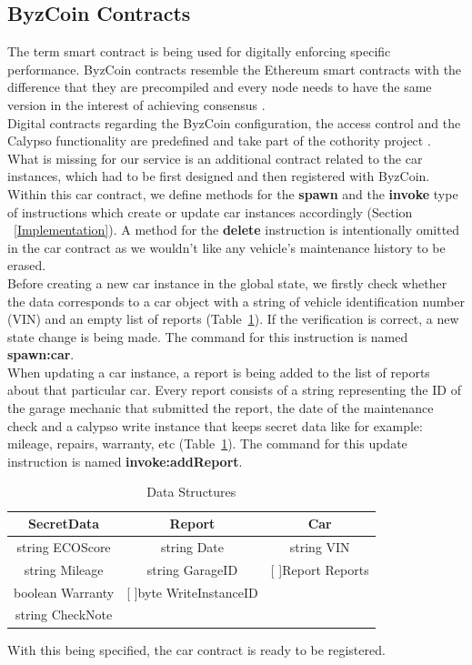 \subsection{ByzCoin Contracts}

The term smart contract is being used for digitally enforcing specific performance. ByzCoin contracts resemble the Ethereum smart contracts \cite{Ethereum} with the difference that they are precompiled and every node needs to have the same version in the interest of achieving consensus \cite{Contracts}.\\
\newline
Digital contracts \cite{Contracts} regarding the ByzCoin configuration, the access control and the Calypso functionality are predefined and take part of the cothority project \cite{Cothority}.
What is missing for our service is an additional contract related to the car instances, which had to be first designed and then registered with ByzCoin.\\
\newline
Within this car contract, we define methods for the \textbf{spawn} and the \textbf{invoke} type of instructions which create or update car instances accordingly (Section ~\ref{Implementation}). A method for the \textbf{delete} instruction is intentionally omitted in the car contract as we wouldn't like any vehicle's maintenance history to be erased.\\
\newline
Before creating a new car instance in the global state, we firstly check whether the data corresponds to a car object with a string of vehicle identification number (VIN) and an empty list of reports (Table~\ref{Data Structures}). If the verification is correct, a new state change is being made. The command for this instruction is named \textbf{spawn:car}.\\
\newline
When updating a car instance, a report is being added to the list of reports about that particular car. Every report consists of a string representing the ID of the garage mechanic that submitted the report, the date of the maintenance check and a calypso write instance that keeps secret data like for example: mileage, repairs, warranty, etc (Table~\ref{Data Structures}). The command for this update instruction is named \textbf{invoke:addReport}.
\begin{table}[h!]
    \centering
 \begin{tabular}{|c | c |c|} 
 \hline
 SecretData & Report & Car \\ [0.5ex] 
 \hline
 string ECOScore & string Date  & string VIN \\ 
 \hline
 string Mileage & string GarageID & [ ]Report Reports \\
 \hline
 boolean Warranty & [ ]byte WriteInstanceID &  \\
 \hline
 string CheckNote & & \\ [0.5ex]
 \hline
\end{tabular}
\caption{Data Structures}
\label{Data Structures}
\end{table}
\newline
With this being specified, the car contract is ready to be registered.




